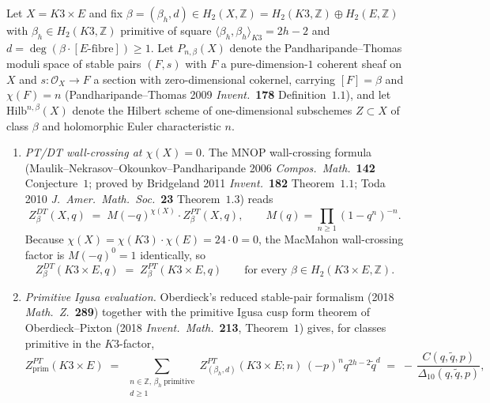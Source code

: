 \begin{proposition}
\label{prop:k3e-cy3-pt-stable-pairs-cosection}
Let $X = K3\times E$ and fix $\beta = (\beta_h, d)\in H_2(X,\mathbb Z) = H_2(K3,\mathbb Z)\oplus H_2(E,\mathbb Z)$ with $\beta_h\in H_2(K3,\mathbb Z)$ primitive of square $\langle\beta_h,\beta_h\rangle_{K3} = 2h-2$ and $d = \deg(\beta\cdot[E\text{-fibre}])\geq 1$. Let $P_{n,\beta}(X)$ denote the Pandharipande--Thomas moduli space of stable pairs $(F, s)$ with $F$ a pure-dimension-$1$ coherent sheaf on $X$ and $s\colon\mathcal O_X\to F$ a section with zero-dimensional cokernel, carrying $[F] = \beta$ and $\chi(F) = n$ \textup{(}Pandharipande--Thomas 2009 \emph{Invent.}~\textbf{178} Definition~$1.1$\textup{)}, and let $\mathrm{Hilb}^{n,\beta}(X)$ denote the Hilbert scheme of one-dimensional subschemes $Z\subset X$ of class $\beta$ and holomorphic Euler characteristic $n$.
\begin{enumerate}[label=\textup{(\roman*)},leftmargin=1.5em]
\item \emph{PT/DT wall-crossing at $\chi(X) = 0$.} The MNOP wall-crossing formula \textup{(}Maulik--Nekrasov--Okounkov--Pandharipande 2006 \emph{Compos.\ Math.}~\textbf{142} Conjecture~$1$; proved by Bridgeland 2011 \emph{Invent.}~\textbf{182} Theorem~$1.1$; Toda 2010 \emph{J.\ Amer.\ Math.\ Soc.}~\textbf{23} Theorem~$1.3$\textup{)} reads
\[
 Z^{DT}_\beta(X, q) \;=\; M(-q)^{\chi(X)}\cdot Z^{PT}_\beta(X, q), \qquad M(q) = \prod_{n\geq 1}(1-q^n)^{-n}.
\]
Because $\chi(X) = \chi(K3)\cdot\chi(E) = 24\cdot 0 = 0$, the MacMahon wall-crossing factor is $M(-q)^0 = 1$ identically, so
\[
 \boxed{Z^{DT}_\beta(K3\times E, q) \;=\; Z^{PT}_\beta(K3\times E, q)} \qquad\text{for every }\beta\in H_2(K3\times E,\mathbb Z).
\]
\item \emph{Primitive Igusa evaluation.} Oberdieck's reduced stable-pair
formalism \textup{(}2018 \emph{Math.\ Z.}~\textbf{289}\textup{)}
together with the primitive Igusa cusp form theorem of
Oberdieck--Pixton \textup{(}2018 \emph{Invent.\ Math.}~\textbf{213},
Theorem~$1$\textup{)} gives, for classes primitive in the \(K3\)-factor,
\[
 Z^{PT}_{\mathrm{prim}}(K3\times E) \;=\; \sum_{\substack{n\in\mathbb Z,\,\beta_h\ \mathrm{primitive}\\ d\geq 1}}Z^{PT}_{(\beta_h,d)}(K3\times E; n)\,(-p)^n q^{2h-2} \tilde q^{d} \;=\; -\,\frac{C(q, \tilde q, p)}{\Delta_{10}(q, \tilde q, p)},
\]
\end{enumerate}
\end{proposition}
